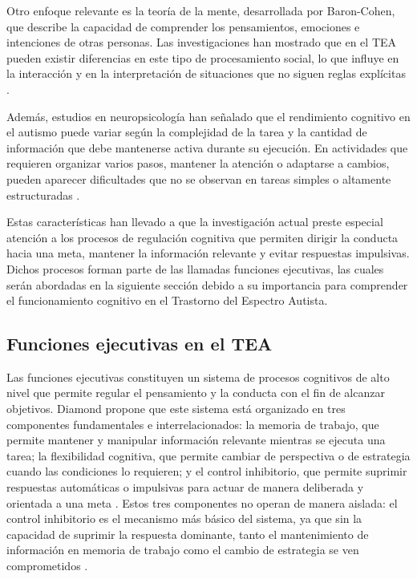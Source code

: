 \documentclass{book}
\begin{document}
Otro enfoque relevante es la teoría de la mente, desarrollada por Baron-Cohen, que describe la capacidad de comprender los pensamientos, emociones e intenciones de otras personas. Las investigaciones han mostrado que en el TEA pueden existir diferencias en este tipo de procesamiento social, lo que influye en la interacción y en la interpretación de situaciones que no siguen reglas explícitas \cite{BaronCohen2000}.

Además, estudios en neuropsicología han señalado que el rendimiento cognitivo en el autismo puede variar según la complejidad de la tarea y la cantidad de información que debe mantenerse activa durante su ejecución. En actividades que requieren organizar varios pasos, mantener la atención o adaptarse a cambios, pueden aparecer dificultades que no se observan en tareas simples o altamente estructuradas \cite{Baddeley2000, Williams2006}.

Estas características han llevado a que la investigación actual preste especial atención a los procesos de regulación cognitiva que permiten dirigir la conducta hacia una meta, mantener la información relevante y evitar respuestas impulsivas. Dichos procesos forman parte de las llamadas funciones ejecutivas, las cuales serán abordadas en la siguiente sección debido a su importancia para comprender el funcionamiento cognitivo en el Trastorno del Espectro Autista.


\subsection{Funciones ejecutivas en el TEA}

Las funciones ejecutivas constituyen un sistema de procesos 
cognitivos de alto nivel que permite regular el pensamiento 
y la conducta con el fin de alcanzar objetivos. Diamond 
propone que este sistema está organizado en tres componentes 
fundamentales e interrelacionados: la memoria de trabajo, 
que permite mantener y manipular información relevante 
mientras se ejecuta una tarea; la flexibilidad cognitiva, 
que permite cambiar de perspectiva o de estrategia cuando 
las condiciones lo requieren; y el control inhibitorio, 
que permite suprimir respuestas automáticas o impulsivas 
para actuar de manera deliberada y orientada a una meta 
\cite{Diamond2013}. Estos tres componentes no operan de 
manera aislada: el control inhibitorio es el mecanismo 
más básico del sistema, ya que sin la capacidad de suprimir 
la respuesta dominante, tanto el mantenimiento de 
información en memoria de trabajo como el cambio de 
estrategia se ven comprometidos \cite{Diamond2013, Miyake2000}.
\end{document}
